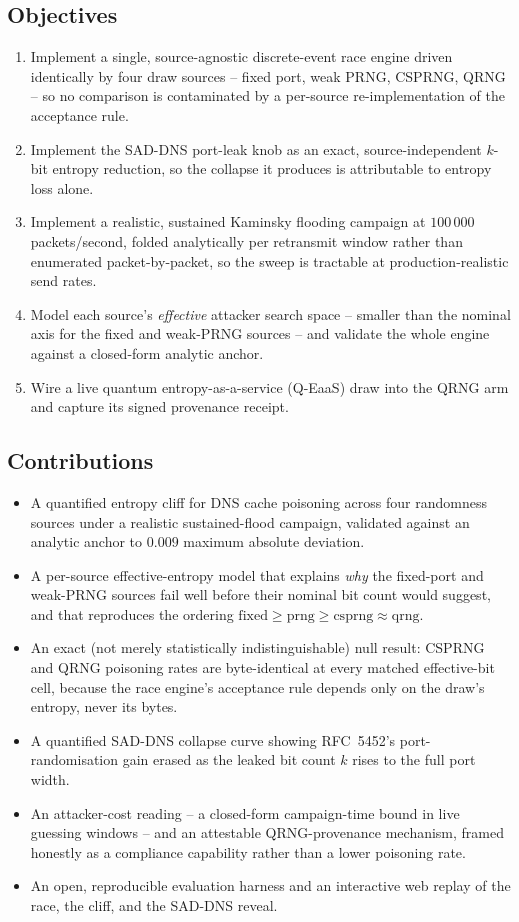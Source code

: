 \documentclass[conference]{IEEEtran}
\begin{document}
\subsection*{Objectives}
\begin{enumerate}
\item Implement a single, source-agnostic discrete-event race engine driven identically by four draw
sources -- fixed port, weak PRNG, CSPRNG, QRNG -- so no comparison is contaminated by a
per-source re-implementation of the acceptance rule.
\item Implement the SAD-DNS port-leak knob as an exact, source-independent $k$-bit entropy reduction, so
the collapse it produces is attributable to entropy loss alone.
\item Implement a realistic, sustained Kaminsky flooding campaign at $100\,000$ packets/second, folded
analytically per retransmit window rather than enumerated packet-by-packet, so the sweep is tractable at
production-realistic send rates.
\item Model each source's \emph{effective} attacker search space -- smaller than the nominal axis for the
fixed and weak-PRNG sources -- and validate the whole engine against a closed-form analytic anchor.
\item Wire a live quantum entropy-as-a-service (Q-EaaS) draw into the QRNG arm and capture its signed
provenance receipt.
\end{enumerate}

\subsection*{Contributions}
\begin{itemize}
\item A quantified entropy cliff for DNS cache poisoning across four randomness sources under a realistic
sustained-flood campaign, validated against an analytic anchor to $0.009$ maximum absolute deviation.
\item A per-source effective-entropy model that explains \emph{why} the fixed-port and weak-PRNG sources
fail well before their nominal bit count would suggest, and that reproduces the ordering
$\mathrm{fixed} \geq \mathrm{prng} \geq \mathrm{csprng} \approx \mathrm{qrng}$.
\item An exact (not merely statistically indistinguishable) null result: CSPRNG and QRNG poisoning rates
are byte-identical at every matched effective-bit cell, because the race engine's acceptance rule depends
only on the draw's entropy, never its bytes.
\item A quantified SAD-DNS collapse curve showing RFC~5452's port-randomisation gain erased as the leaked
bit count $k$ rises to the full port width.
\item An attacker-cost reading -- a closed-form campaign-time bound in live guessing windows -- and an
attestable QRNG-provenance mechanism, framed honestly as a compliance capability rather than a lower
poisoning rate.
\item An open, reproducible evaluation harness and an interactive web replay of the race, the cliff, and
the SAD-DNS reveal.
\end{itemize}
\end{document}
